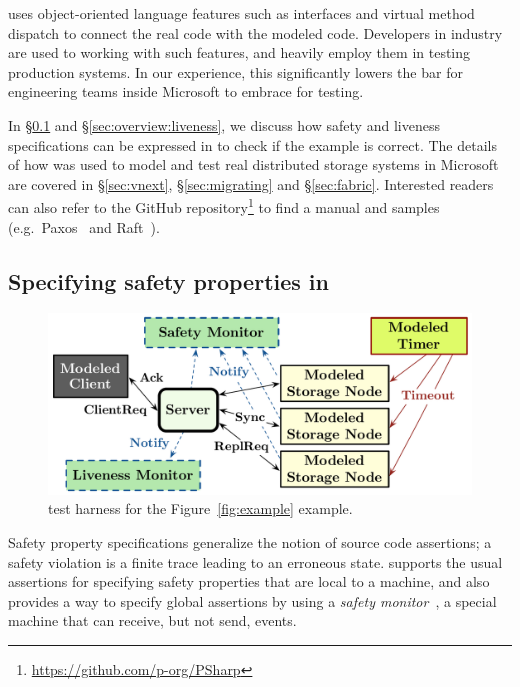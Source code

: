 \psharp uses object-oriented language features such as interfaces and virtual method dispatch to connect the real code with the modeled code. Developers in industry are used to working with such features, and heavily employ them in testing production systems. In our experience, this significantly lowers the bar for engineering teams inside Microsoft to embrace \psharp for testing.

In \S\ref{sec:overview:safety} and \S\ref{sec:overview:liveness}, we discuss how safety and liveness specifications can be expressed in \psharp to check if the example is correct. The details of how \psharp was used to model and test real distributed storage systems in Microsoft are covered in \S\ref{sec:vnext}, \S\ref{sec:migrating} and \S\ref{sec:fabric}. Interested readers can also refer to the \psharp GitHub repository\footnote{\url{https://github.com/p-org/PSharp}} to find a manual and samples (e.g.\ Paxos~\cite{lamport1998part} and Raft~\cite{ongaro2014raft}).

\vspace{-1mm}
\subsection{Specifying safety properties in \psharp}
\label{sec:overview:safety}

\begin{figure}[t]
\centering
\includegraphics[width=\linewidth]{img/example}
\vspace{-5mm}
\caption{\psharp test harness for the Figure~\ref{fig:example} example.}
\label{fig:example:model}
\vspace{-2mm}
\end{figure}

Safety property specifications generalize the notion of source code assertions; a safety violation is a finite trace leading to an erroneous state. \psharp supports the usual assertions for specifying safety properties that are local to a \psharp machine, and also provides a way to specify global assertions by using a \emph{safety monitor}~\cite{desai2015building}, a special \psharp machine that can receive, but not send, events.

